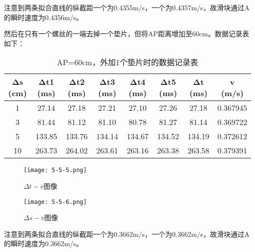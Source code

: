 \documentclass[12pt]{article}
\begin{document}
注意到两条拟合直线的纵截距一个为0.4355m/s，一个为0.4357m/s，故滑块通过A的瞬时速度为0.4356m/s。

然后在只有一个螺丝的一端去掉一个垫片，但将AP距离增加至60cm。数据记录表如下：

\begin{table}[htbp]
    \centering
    \begin{tabular}{|c|c|c|c|c|c|c|c|}
    \hline
    Δs (cm) & Δt1 (ms) & Δt2 (ms) & Δt3 (ms) & Δt4 (ms) & Δt5 (ms) & Δt (ms) & v (m/s) \\
    \hline
    1    & 27.14  & 27.18  & 27.21  & 27.10  & 27.26  & 27.18  & 0.367945  \\
    \hline
    3    & 81.44  & 81.12  & 81.10  & 80.78  & 81.27  & 81.14  & 0.369722  \\
    \hline
    5    & 133.85  & 133.76  & 134.14  & 134.67  & 134.52  & 134.19  & 0.372612  \\
    \hline
    10   & 263.73  & 264.02  & 263.61  & 263.16  & 263.38  & 263.58  & 0.379391  \\
    \hline
    \end{tabular}
    \caption{AP=60cm，外加1个垫片时的数据记录表}
\end{table}

\begin{figure}[htbp]
    \begin{minipage}[t]{0.5\linewidth}
        \centering
        \texttt{[image: 5-5-5.png]}
        \caption{$\Delta t-\overline{v}$图像}
    \end{minipage}
    \begin{minipage}[t]{0.5\linewidth}
        \centering
        \texttt{[image: 5-5-6.png]}
        \caption{$\Delta s-\overline{v}$图像}
    \end{minipage}
\end{figure}

注意到两条拟合直线的纵截距一个为0.3662m/s，一个为0.3662m/s，故滑块通过A的瞬时速度为0.3662m/s。
\end{document}

